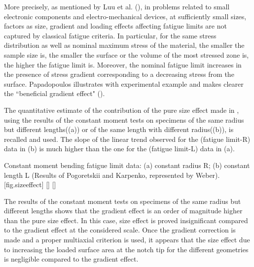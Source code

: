 More precisely, as mentioned by Luu et al. (\cite{luu2014formulation}), in problems related to small electronic components and electro-mechanical devices, at sufficiently small sizes, factors as size, gradient and loading effects affecting fatigue limits are not captured by classical fatigue criteria. In particular,  for the same stress distribution as well as nominal maximum stress of the material, the smaller the sample size is, the smaller the surface or the volume of the most stressed zone is, the higher the fatigue limit is.  Moreover, the nominal fatigue limit increases in the presence of stress gradient corresponding to a decreasing stress from the surface. Papadopoulos illustrates with experimental example and makes clearer the ``beneficial gradient effect" (\cite{Papadopoulos1996513}). 

The quantitative estimate of the contribution of the pure size effect made in \cite{Papadopoulos1996513}, using the results of the constant moment tests on specimens of the same radius but different lengths((a)) or of the same length with different radius((b)), is recalled and
used. The slope of the linear trend observed for the (fatigue limit-R)
data in (b) is much higher than the one for the (fatigue limit-L) data in (a).
\begin{Figure}[!h]{Constant moment bending fatigue limit data: (a) constant radius R; (b) constant length L (Results of Pogoretskii and Karpenko\cite{Pogoretskii1966}, represented by Weber\cite{weber1999fatigue}).}[fig.sizeeffect]
\end{Figure}

The results of the constant moment tests on specimens of the same radius but different lengths shows that the gradient effect is an order of magnitude higher than the pure size effect. In this case, size effect is proved insignificant compared to the gradient effect at the considered scale. Once the gradient correction is made and a proper multiaxial criterion is used, it appears that the size effect due to increasing the loaded surface area at the notch tip for the different geometries is negligible compared to the gradient effect.

